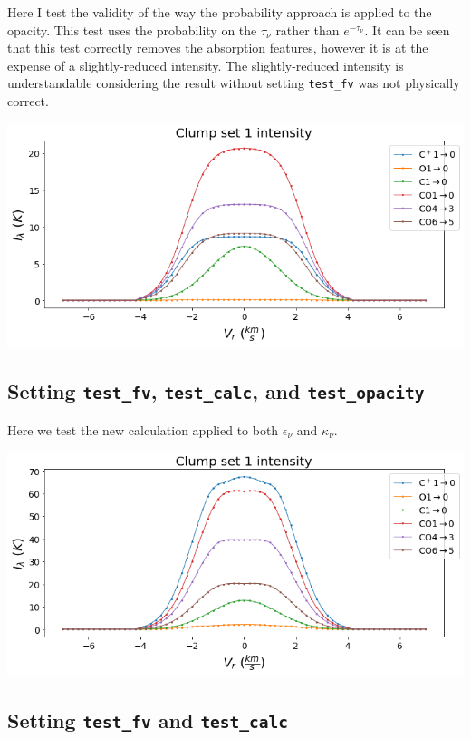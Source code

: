 \documentclass[a4paper]{article}
\begin{document}
    Here I test the validity of the way the probability approach is applied to the opacity.
    This test uses the probability on the \(\tau_\nu\) rather than \(e^{-\tau_\nu}\).
    It can be seen that this test correctly removes the absorption features, however it is at the expense of a slightly-reduced intensity.
    The slightly-reduced intensity is understandable considering the result without setting \texttt{test\_fv} was not physically correct.

    \includegraphics*[width=\linewidth]{voxel_error_fv-pexp.png}

    \pagebreak

    \subsection{Setting \texttt{test\_fv}, \texttt{test\_calc}, and \texttt{test\_opacity}}

    Here we test the new calculation applied to both \(\epsilon_\nu\) and \(\kappa_\nu\).

    \includegraphics*[width=\linewidth]{voxel_error_fv-calc-opacity.png}

    \subsection{Setting \texttt{test\_fv} and \texttt{test\_calc}}
\end{document}
